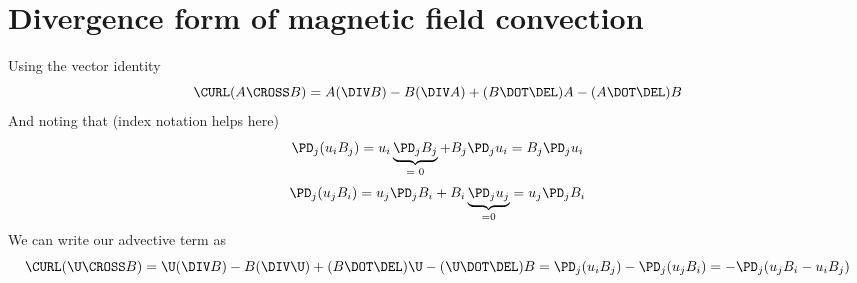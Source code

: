 \documentclass[11pt]{article}
\begin{document}
\doublespacing
\MOONSTITLE
\maketitle

\section{Divergence form of magnetic field convection}

Using the vector identity
\begin{equation}
	\CURL (A\CROSS B) =
	A(\DIV B)
	- B(\DIV A)
	+(B \DOT \DEL)A - (A \DOT \DEL)B
\end{equation}
And noting that (index notation helps here)
\begin{equation}
	\PD_j (u_i B_j) =
	u_i \underbrace{\PD_j B_j}_\text{= 0} + B_j \PD_j u_i
	= B_j \PD_j u_i
\end{equation}
\begin{equation}
	\PD_j (u_j B_i) =
	u_j \PD_j B_i + B_i \underbrace{\PD_j u_j}_\text{=0}
	= u_j \PD_j B_i
\end{equation}
We can write our advective term as
\begin{equation}
	\CURL (\U \CROSS B)
	= \U(\DIV B)
	- B(\DIV \U)
	+ (B \DOT \DEL)\U
	- (\U \DOT \DEL)B
	=
	\PD_j (u_i B_j) - \PD_j (u_j B_i)
	=
	-\PD_j (u_j B_i - u_i B_j)
\end{equation}
\end{document}
